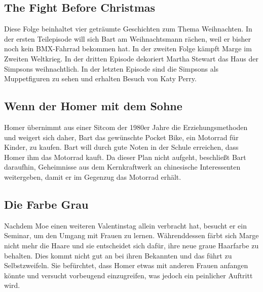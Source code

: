 
\subsection{The Fight Before Christmas}
Diese Folge beinhaltet vier geträumte Geschichten zum Thema Weihnachten. In der ersten Teilepisode will sich Bart am Weihnachtsmann rächen, weil er bisher noch kein BMX-Fahrrad bekommen hat. In der zweiten Folge kämpft Marge im Zweiten Weltkrieg. In der dritten Episode dekoriert Martha Stewart das Haus der Simpsons weihnachtlich. In der letzten Episode sind die Simpsons als Muppetfiguren zu sehen und erhalten Besuch von Katy Perry.


\subsection{Wenn der Homer mit dem Sohne}
Homer übernimmt aus einer Sitcom der 1980er Jahre die Erziehungsmethoden und weigert sich daher, Bart das gewünschte Pocket Bike, ein Motorrad für Kinder, zu kaufen. Bart will durch gute Noten in der Schule erreichen, dass Homer ihm das Motorrad kauft. Da dieser Plan nicht aufgeht, beschließt Bart daraufhin, Geheimnisse aus dem Kernkraftwerk an chinesische Interessenten weitergeben, damit er im Gegenzug das Motorrad erhält. 


\subsection{Die Farbe Grau}\label{NABF06}
Nachdem Moe einen weiteren Valentinstag allein verbracht hat, besucht er ein Seminar, um den Umgang mit Frauen zu lernen. Währenddessen färbt sich Marge nicht mehr die Haare und sie entscheidet sich dafür, ihre neue graue Haarfarbe zu behalten. Dies kommt nicht gut an bei ihren Bekannten und das führt zu Selbstzweifeln. Sie befürchtet, dass Homer etwas mit anderen Frauen anfangen könnte und versucht vorbeugend einzugreifen, was jedoch ein peinlicher Auftritt wird. 

